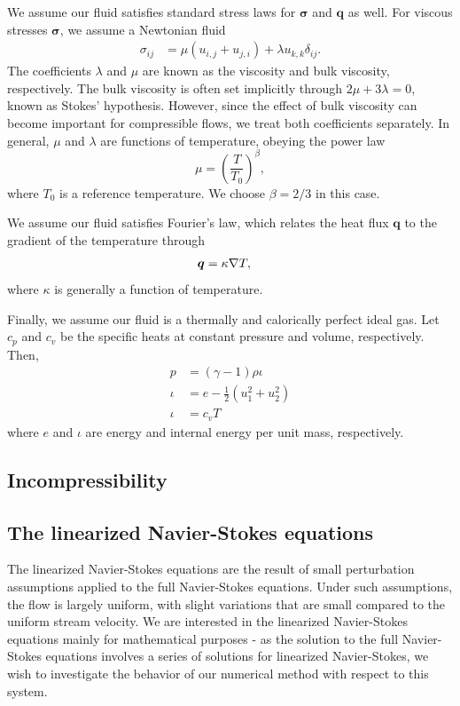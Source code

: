 We assume our fluid satisfies standard stress laws for $\boldsymbol \sigma$ and $\boldsymbol q$ as well. For viscous stresses $\boldsymbol \sigma$, we assume a Newtonian fluid
\begin{align*}
\sigma_{ij} &= \mu(u_{i,j}+u_{j,i}) + \lambda u_{k,k}\delta_{ij}.
\end{align*}
The coefficients $\lambda$ and $\mu$ are known as the viscosity and bulk viscosity, respectively. The bulk viscosity is often set implicitly through $2\mu + 3\lambda = 0$, known as Stokes' hypothesis. However, since the effect of bulk viscosity can become important for compressible flows, we treat both coefficients separately. In general, $\mu$ and $\lambda$ are functions of temperature, obeying the power law
\[
\mu = \left(\frac{T}{T_0}\right)^\beta,
\]
where $T_0$ is a reference temperature. We choose $\beta = 2/3$ in this case. 

We assume our fluid satisfies Fourier's law, which relates the heat flux $\boldsymbol q$ to the gradient of the temperature through
\begin{align*}
{\boldsymbol q} &= \kappa \grad T,
\end{align*}
where $\kappa$ is generally a function of temperature. 

Finally, we assume our fluid is a thermally and calorically perfect ideal gas. Let $c_p$ and $c_v$ be the specific heats at constant pressure and volume, respectively. Then,
\begin{align*}
p &= (\gamma-1)\rho\iota\\
\iota &= e-\frac{1}{2}(u_1^2+u_2^2)\\
\iota &= c_vT
\end{align*}
where $e$ and $\iota$ are energy and internal energy per unit mass, respectively. 


\subsection{Incompressibility}

\cite{stokesDPG}

\subsection{The linearized Navier-Stokes equations}

The linearized Navier-Stokes equations are the result of small perturbation assumptions applied to the full Navier-Stokes equations. Under such assumptions, the flow is largely uniform, with slight variations that are small compared to the uniform stream velocity. We are interested in the linearized Navier-Stokes equations mainly for mathematical purposes - as the solution to the full Navier-Stokes equations involves a series of solutions for linearized Navier-Stokes, we wish to investigate the behavior of our numerical method with respect to this system.  

